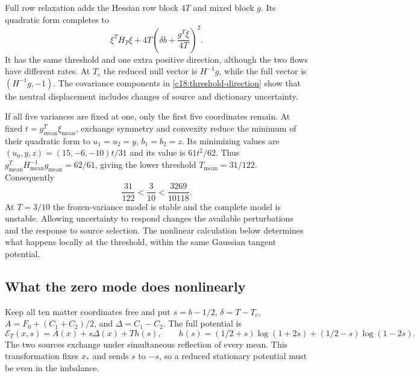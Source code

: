 Full row relaxation adds the Hessian row block $4T$ and mixed block $g$. Its quadratic form completes to
\begin{equation}
 \xi^TH_T\xi+4T\left(\delta b+\frac{g^T\xi}{4T}\right)^2.
 \label{c18:full-threshold}
\end{equation}
It has the same threshold and one extra positive direction, although the two flows have different rates. At $T_c$ the reduced null vector is $H^{-1}g$, while the full vector is $(H^{-1}g,-1)$. The covariance components in \cref{c18:threshold-direction} show that the neutral displacement includes changes of source and dictionary uncertainty.

If all five variances are fixed at one, only the first five coordinates remain. At fixed $t=g_{\mathrm{mean}}^T\xi_{\mathrm{mean}}$, exchange symmetry and convexity reduce the minimum of their quadratic form to $u_1=u_2=y$, $b_1=b_2=z$. Its minimizing values are $(u_0,y,z)=(15,-6,-10)t/31$ and its value is $61t^2/62$. Thus $g_{\mathrm{mean}}^TH_{\mathrm{mean}}^{-1}g_{\mathrm{mean}}=62/61$, giving the lower threshold $T_{\mathrm{mean}}=31/122$. Consequently
\begin{equation}
 \frac{31}{122}<\frac3{10}<\frac{3269}{10118}.
 \label{c18:threshold-contrast}
\end{equation}
At $T=3/10$ the frozen-variance model is stable and the complete model is unstable. Allowing uncertainty to respond changes the available perturbations and the response to source selection. The nonlinear calculation below determines what happens locally at the threshold, within the same Gaussian tangent potential.

\subsection{What the zero mode does nonlinearly}
\label{c18:critical-mode}

Keep all ten matter coordinates free and put $s=b-1/2$, $\delta=T-T_c$, $A=F_0+(C_1+C_2)/2$, and $\Delta=C_1-C_2$. The full potential is
\begin{equation}
 \mathcal E_T(x,s)=A(x)+s\Delta(x)+Th(s),\qquad
 h(s)=(1/2+s)\log(1+2s)+(1/2-s)\log(1-2s).
 \label{c18:critical-potential}
\end{equation}
The two sources exchange under simultaneous reflection of every mean. This transformation fixes $x_*$ and sends $s$ to $-s$, so a reduced stationary potential must be even in the imbalance.

